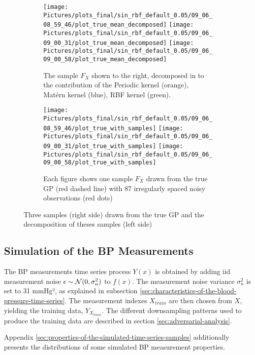 \begin{figure}[!htb]
\centering
\begin{subfigure}{.45\textwidth}
    \centering
    \texttt{[image: Pictures/plots\_final/sin\_rbf\_default\_0.05/09\_06\_08\_59\_46/plot\_true\_mean\_decomposed]}
    \texttt{[image: Pictures/plots\_final/sin\_rbf\_default\_0.05/09\_06\_09\_00\_31/plot\_true\_mean\_decomposed]}
    \texttt{[image: Pictures/plots\_final/sin\_rbf\_default\_0.05/09\_06\_09\_00\_58/plot\_true\_mean\_decomposed]}
  \caption{The sample $F_X$ shown to the right, decomposed in to the contribution of the Periodic kernel (orange),
      Matérn kernel (blue), RBF kernel (green).}
  \label{fig:true_mean_decomposed}
\end{subfigure}\hfill
\begin{subfigure}{.45\textwidth}
    \centering
    \texttt{[image: Pictures/plots\_final/sin\_rbf\_default\_0.05/09\_06\_08\_59\_46/plot\_true\_with\_samples]}
    \texttt{[image: Pictures/plots\_final/sin\_rbf\_default\_0.05/09\_06\_09\_00\_31/plot\_true\_with\_samples]}
    \texttt{[image: Pictures/plots\_final/sin\_rbf\_default\_0.05/09\_06\_09\_00\_58/plot\_true\_with\_samples]}
  \caption{Each figure shows one sample $F_X$ drawn from the true GP (red dashed line) with 87 irregularly spaced
    noisy observations (red dots) }
  \label{fig:sub2}
\end{subfigure}
\caption[Samples Drawn from the True GP]{Three samples (right side) drawn from the true GP and the decomposition of theses samples (left side)}
\label{fig:true_gp_samples}
\end{figure}


\subsection{Simulation of the BP Measurements}\label{subsec:simulation-of-the-bp-measurements}

The BP measurements time series process $Y(x)$ is obtained by adding iid measurement noise
$\epsilon \sim \operatorname{\mathcal{N}}(0, \sigma_n^2)$ to $f(x)$.
The measurement noise variance
$\sigma_n^2$ is set to 31 mmHg², as explained in subsection
\ref{sec:characteristics-of-the-blood-pressure-time-series}.
The measurement indexes $X_{train}$ are then chosen
from $X$, yielding the training data, $Y_{X_{train}}$.
The different downsampling patterns used to produce the training data
are described in section \ref{sec:adversarial-analysis}.

Appendix \ref{sec:properties-of-the-simulated-time-series-samples} additionally presents
the distributions of some simulated BP measurement properties.


